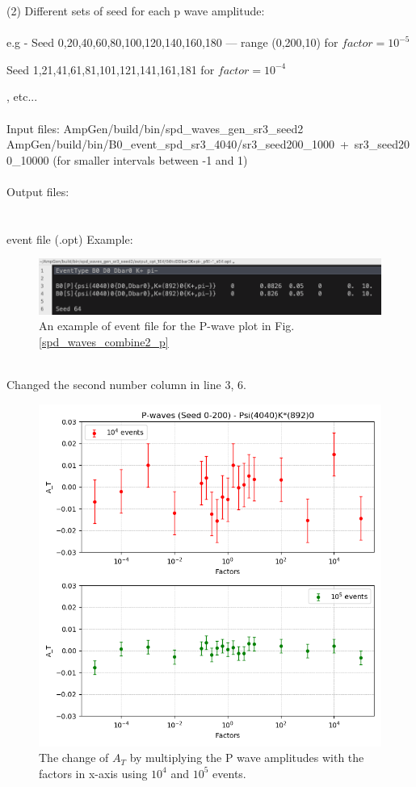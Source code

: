 \clearpage
\noindent (2) Different sets of seed for each p wave amplitude:
\\
\\
e.g - Seed 0,20,40,60,80,100,120,140,160,180 --- range (0,200,10) for $factor = 10^{-5}$

Seed 1,21,41,61,81,101,121,141,161,181 for $factor = 10^{-4}$
  
, etc...
\\
\\
\indent Input files: AmpGen/build/bin/spd\_waves\_gen\_sr3\_seed2 
\\
\indent \indent \indent \indent AmpGen/build/bin/B0\_event\_spd\_sr3\_4040/sr3\_seed200\_1000\ +\ sr3\_seed200\_10000 (for smaller intervals between -1 and 1)
\\
\\
\indent Output files: 
\\
\indent \indent \indent {}
\\
\\
event file (.opt) Example:
\\
\begin{figure}[h]
\center
\includegraphics*[width=0.96\linewidth]{p_wave/event_info_combine2_p_10000}
\caption{An example of event file for the P-wave plot in Fig.\ref{spd_waves_combine2_p}}
\label{event_info_combine2_p_10000}
\end{figure}
\\
Changed the second number column in line 3, 6.
\begin{figure}[h]
\center
\includegraphics*[width=0.60\linewidth]{p_wave/spd_waves_combined2_p}
\caption{The change of $A_T$ by multiplying the P wave amplitudes with the factors in x-axis using $10^4$ and $10^5$ events. }
\label{spd_waves_combined2_p}
\end{figure}
